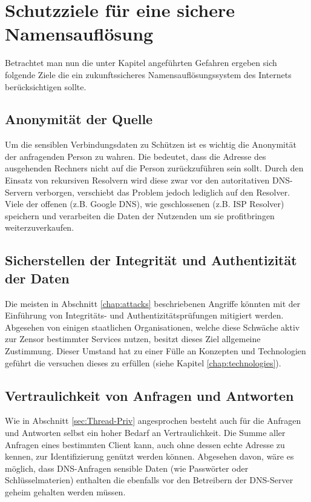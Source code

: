 \chapter{Schutzziele für eine sichere Namensauflösung}
\label{chap:goals}

Betrachtet man nun die unter Kapitel \label{cap:threads} angeführten Gefahren ergeben sich folgende Ziele die ein zukunftssicheres Namensauflösungssystem des Internets berücksichtigen sollte\cite{Grothoff2018}. 

\section{Anonymität der Quelle}
\label{sec:goals-sourceanon}
Um die sensiblen Verbindungsdaten zu Schützen ist es wichtig die Anonymität der anfragenden Person zu wahren. Die bedeutet, dass die Adresse des ausgehenden Rechners nicht auf die Person zurückzuführen sein sollt. Durch den Einsatz von rekursiven Resolvern wird diese zwar vor den autoritativen DNS-Servern verborgen, verschiebt das Problem jedoch lediglich auf den Resolver. Viele der offenen (z.B. Google DNS), wie geschlossenen (z.B. ISP Resolver) speichern und verarbeiten die Daten der Nutzenden um sie profitbringen weiterzuverkaufen.

\section{Sicherstellen der Integrität und Authentizität der Daten}
\label{sec:goals-recordsecurity}
Die meisten in Abschnitt \ref{chap:attacks} beschriebenen Angriffe könnten mit der Einführung von Integritäts- und Authentizitätsprüfungen mitigiert werden. Abgesehen von einigen staatlichen Organisationen, welche diese Schwäche aktiv zur Zensor bestimmter Services nutzen, besitzt dieses Ziel allgemeine Zustimmung. Dieser Umstand hat zu einer Fülle an Konzepten und Technologien geführt die versuchen dieses zu erfüllen (siehe Kapitel \ref{chap:technologies}). 

\section{Vertraulichkeit von Anfragen und Antworten}
\label{sec:goals-requestsecurity}
Wie in Abschnitt \ref{sec:Thread-Priv} angesprochen besteht auch für die Anfragen und Antworten selbst ein hoher Bedarf an Vertraulichkeit. Die Summe aller Anfragen eines bestimmten Client kann, auch ohne dessen echte Adresse zu kennen, zur Identifizierung genützt werden können. Abgesehen davon, wäre es möglich, dass DNS-Anfragen sensible Daten (wie Passwörter oder Schlüsselmaterien) enthalten die ebenfalls vor den Betreibern der DNS-Server geheim gehalten werden müssen.

